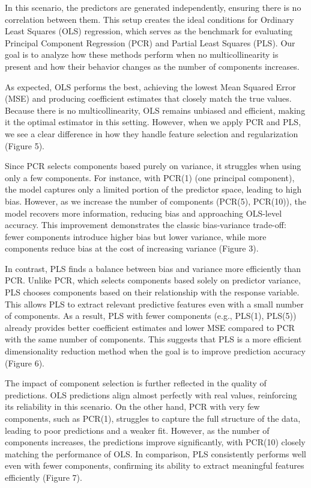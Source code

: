 \documentclass[11pt,twoside,a4paper]{article}
\begin{document}
In this scenario, the predictors are generated independently, ensuring there is no correlation between them. This setup creates the ideal conditions for Ordinary Least Squares (OLS) regression, which serves as the benchmark for evaluating Principal Component Regression (PCR) and Partial Least Squares (PLS). Our goal is to analyze how these methods perform when no multicollinearity is present and how their behavior changes as the number of components increases.

As expected, OLS performs the best, achieving the lowest Mean Squared Error (MSE) and producing coefficient estimates that closely match the true values. Because there is no multicollinearity, OLS remains unbiased and efficient, making it the optimal estimator in this setting. However, when we apply PCR and PLS, we see a clear difference in how they handle feature selection and regularization (Figure 5).  

Since PCR selects components based purely on variance, it struggles when using only a few components. For instance, with PCR(1) (one principal component), the model captures only a limited portion of the predictor space, leading to high bias. However, as we increase the number of components (PCR(5), PCR(10)), the model recovers more information, reducing bias and approaching OLS-level accuracy. This improvement demonstrates the classic bias-variance trade-off: fewer components introduce higher bias but lower variance, while more components reduce bias at the cost of increasing variance (Figure 3).  

In contrast, PLS finds a balance between bias and variance more efficiently than PCR. Unlike PCR, which selects components based solely on predictor variance, PLS chooses components based on their relationship with the response variable. This allows PLS to extract relevant predictive features even with a small number of components. As a result, PLS with fewer components (e.g., PLS(1), PLS(5)) already provides better coefficient estimates and lower MSE compared to PCR with the same number of components. This suggests that PLS is a more efficient dimensionality reduction method when the goal is to improve prediction accuracy (Figure 6).

The impact of component selection is further reflected in the quality of predictions. OLS predictions align almost perfectly with real values, reinforcing its reliability in this scenario. On the other hand, PCR with very few components, such as PCR(1), struggles to capture the full structure of the data, leading to poor predictions and a weaker fit. However, as the number of components increases, the predictions improve significantly, with PCR(10) closely matching the performance of OLS. In comparison, PLS consistently performs well even with fewer components, confirming its ability to extract meaningful features efficiently (Figure 7).
\end{document}
